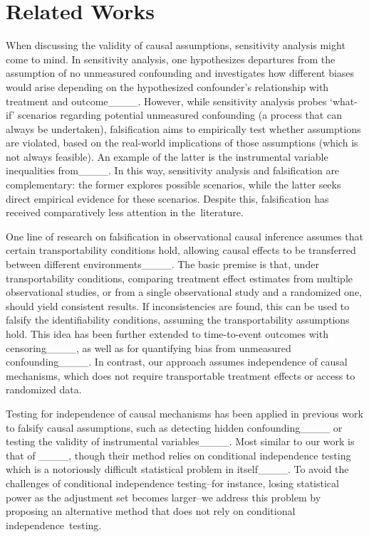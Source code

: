 \section{Related Works}
When discussing the validity of causal assumptions, sensitivity analysis might come to mind. In sensitivity analysis, one hypothesizes departures from the assumption of no unmeasured confounding and investigates how different biases would arise depending on the hypothesized confounder's relationship with treatment and outcome____. However, while sensitivity analysis probes `what-if' scenarios regarding potential unmeasured confounding (a process that can always be undertaken), falsification aims to empirically test whether assumptions are violated, based on the real-world implications of those assumptions (which is not always feasible). An example of the latter is the instrumental variable inequalities from____. In this way, sensitivity analysis and falsification are complementary: the former explores possible scenarios, while the latter seeks direct empirical evidence for these scenarios. Despite this, falsification has received comparatively less attention in the~literature.

One line of research on falsification in observational causal inference assumes that certain transportability conditions hold, allowing causal effects to be transferred between different environments____. The basic premise is that, under transportability conditions, comparing treatment effect estimates from multiple observational studies, or from a single observational study and a randomized one, should yield consistent results. If inconsistencies are found, this can be used to falsify the identifiability conditions, assuming the transportability assumptions hold. This idea has been further extended to time-to-event outcomes with censoring____, as well as for quantifying bias from unmeasured confounding____. In contrast, our approach assumes independence of causal mechanisms, which does not require transportable treatment effects or access to randomized data. 

Testing for independence of causal mechanisms has been applied in previous work to falsify causal assumptions, such as detecting hidden confounding____ or testing the validity of instrumental variables____. Most similar to our work is that of ____, though their method relies on conditional independence testing which is a notoriously difficult statistical problem in itself____. To avoid the challenges of conditional independence testing--for instance, losing statistical power as the adjustment set becomes larger--we address this problem by proposing an alternative method that does not rely on conditional independence~testing.


